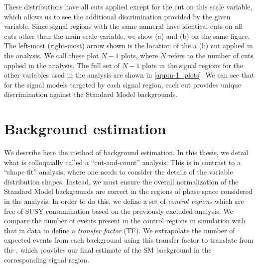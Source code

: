 These distributions have all cuts applied except for the cut on this scale variable, which allows us to see the additional discrimination provided by the given variable.
Since signal regions with the same numeral have identical cuts on all cuts other than the main scale variable, we show (a) and (b) on the same figure.
The left-most (right-most) arrow shown is the location of the a (b) cut applied in the analysis.
We call these plot \textit{$N-1$} plots, where $N$ refers to the number of cuts applied in the analysis.
The full set of $N-1$ plots in the signal regions for the other variables used in the analysis are shown in \ref{app:n-1_plots}.
We can see that for the signal models targeted by each signal region, each cut provides unique discrimination against the Standard Model backgrounds.



\section{Background estimation}

We describe here the method of background estimation.
In this thesis, we detail what is colloquially called a ``cut-and-count'' analysis.
This is in contrast to a ``shape fit'' analysis, where one needs to consider the details of the variable distribution shapes.
Instead, we must ensure the overall normalization of the Standard Model backgrounds are correct in the regions of phase space considered in the analysis.
In order to do this, we define a set of \textit{control regions} which are free of SUSY contamination based on the previously excluded analysis.
We compare the number of events present in the control regions in simulation with that in data to define a \textit{transfer factor} (TF).
We extrapolate the number of expected events from each background using this transfer factor to translate from the , which provides our final estimate of the SM background in the corresponding signal region.\footnotemark
{}

